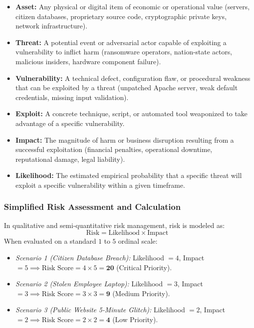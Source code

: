 \begin{itemize}
\item \textbf{Asset:} Any physical or digital item of economic or operational value (servers, citizen databases, proprietary source code, cryptographic private keys, network infrastructure).
\item \textbf{Threat:} A potential event or adversarial actor capable of exploiting a vulnerability to inflict harm (ransomware operators, nation-state actors, malicious insiders, hardware component failure).
\item \textbf{Vulnerability:} A technical defect, configuration flaw, or procedural weakness that can be exploited by a threat (unpatched Apache server, weak default credentials, missing input validation).
\item \textbf{Exploit:} A concrete technique, script, or automated tool weaponized to take advantage of a specific vulnerability.
\item \textbf{Impact:} The magnitude of harm or business disruption resulting from a successful exploitation (financial penalties, operational downtime, reputational damage, legal liability).
\item \textbf{Likelihood:} The estimated empirical probability that a specific threat will exploit a specific vulnerability within a given timeframe.
\end{itemize}

\subsubsection{Simplified Risk Assessment and Calculation}

In qualitative and semi-quantitative risk management, risk is modeled as:
\[ \text{Risk} = \text{Likelihood} \times \text{Impact} \]
When evaluated on a standard $1$ to $5$ ordinal scale:
\begin{itemize}
\item \textit{Scenario 1 (Citizen Database Breach):} Likelihood $= 4$, Impact $= 5 \implies \text{Risk Score} = 4 \times 5 = \mathbf{20}$ (Critical Priority).
\item \textit{Scenario 2 (Stolen Employee Laptop):} Likelihood $= 3$, Impact $= 3 \implies \text{Risk Score} = 3 \times 3 = \mathbf{9}$ (Medium Priority).
\item \textit{Scenario 3 (Public Website 5-Minute Glitch):} Likelihood $= 2$, Impact $= 2 \implies \text{Risk Score} = 2 \times 2 = \mathbf{4}$ (Low Priority).
\end{itemize}

